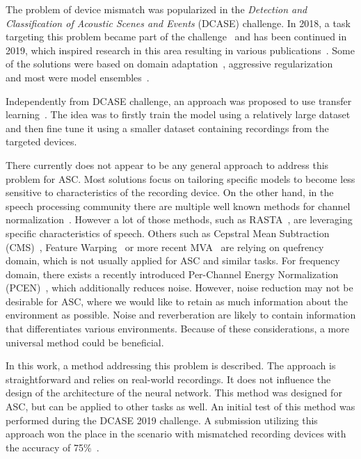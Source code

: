 \documentclass[a4paper]{article}
\begin{document}
The problem of device mismatch was popularized in the \textit{Detection and Classification of Acoustic Scenes and Events} (DCASE) challenge. In 2018, a task targeting this problem became part of the challenge~\cite{dcase} and has been continued in 2019, which inspired research in this area resulting in various publications~\cite{truc,da-asc,nguyenAcousticSceneClassification2020}. Some of the solutions were based on domain adaptation~\cite{dcase-Eghbal-zadeh2019}, aggressive regularization~\cite{dcase-Eghbal-zadeh2019,dcase-Gao2019} and most were model ensembles~\cite{dcase-Nguyen2018}. 

Independently from DCASE challenge, an approach was proposed to use transfer learning~\cite{transfer-wireless}. The idea was to firstly train the model using a relatively large dataset and then fine tune it using a smaller dataset containing recordings from the targeted devices.

There currently does not appear to be any general approach to address this problem for ASC. Most solutions focus on tailoring specific models to become less sensitive to characteristics of the recording device. On the other hand, in the speech processing community there are multiple well known methods for channel normalization~\cite{junquaRobustnessLanguageSpeech2001, sternSignalProcessingRobust1996, burgetAnalysisFeatureExtraction2007}. However a lot of those methods, such as RASTA~\cite{hermanskyRASTAProcessingSpeech1994}, are leveraging specific characteristics of speech. Others such as Cepstral Mean Subtraction (CMS)~\cite{atalEffectivenessLinearPrediction1974a}, Feature Warping~\cite{pelecanosFeatureWarpingRobust2001} or more recent MVA~\cite{chenMVAProcessingSpeech2007} are relying on quefrency domain, which is not usually applied for ASC and similar tasks. For frequency domain, there exists a recently introduced Per-Channel Energy Normalization (PCEN)~\cite{wangTrainableFrontendRobust2017,lostanlenPerChannelEnergyNormalization2019a}, which additionally reduces noise.
However, noise reduction may not be desirable for ASC, where we would like to retain as much information about the environment as possible. Noise and reverberation are likely to contain information that differentiates various environments.
Because of these considerations, a more universal method could be beneficial.

In this work, a method addressing this problem is described. The approach is straightforward and relies on real-world recordings. It does not influence the design of the architecture of the neural network. This method was designed for ASC, but can be applied to other tasks as well. An initial test of this method was performed during the DCASE 2019 challenge. A submission utilizing this approach won the  place in the scenario with mismatched recording devices with the accuracy of 75\%~\cite{Komider2019}.
\end{document}
